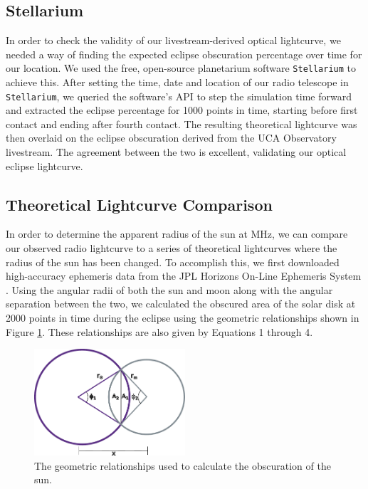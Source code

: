\subsection{\label{sec:stellarium}Stellarium}

In order to check the validity of our livestream-derived optical lightcurve, we needed a way of finding the expected eclipse obscuration percentage over time for our location.
We used the free, open-source planetarium software \texttt{Stellarium}\cite{zotti_simulated_2020} to achieve this.
After setting the time, date and location of our radio telescope in \texttt{Stellarium}\cite{zotti_simulated_2020}, we queried the software's API to step the simulation time forward and extracted the eclipse percentage for 1000 points in time, starting before first contact and ending after fourth contact.
The resulting theoretical lightcurve was then overlaid on the eclipse obscuration derived from the UCA Observatory livestream.
The agreement between the two is excellent, validating our optical eclipse lightcurve.

\subsection{\label{sec:theoreticalLightcurves}Theoretical Lightcurve Comparison}

In order to determine the apparent radius of the sun at \unit[1420]{MHz}, we can compare our observed radio lightcurve to a series of theoretical lightcurves where the radius of the sun has been changed.
To accomplish this, we first downloaded high-accuracy ephemeris data from the JPL Horizons On-Line Ephemeris System \cite{nasa_jpl_solar_system_dynamics_group_jpl_nodate}. 
Using the angular radii of both the sun and moon along with the angular separation between the two, we calculated the obscured area of the solar disk at 2000 points in time during the eclipse using the geometric relationships shown in Figure \ref{fig:eclipse_geometry}.
These relationships are also given by Equations 1 through 4.

\begin{figure}
  \includegraphics[width=0.5\textwidth]{figures/drawing}
  \caption{\label{fig:eclipse_geometry} The geometric relationships used to calculate the obscuration of the sun.}
\end{figure}

